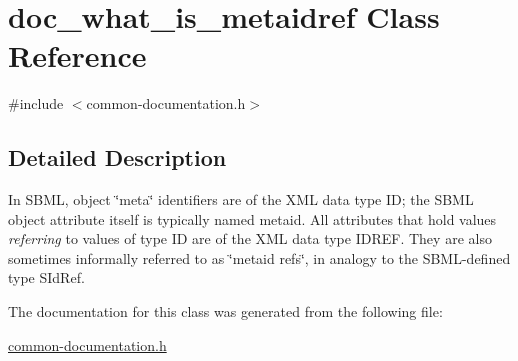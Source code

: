 \hypertarget{classdoc__what__is__metaidref}{}\section{doc\+\_\+what\+\_\+is\+\_\+metaidref Class Reference}
\label{classdoc__what__is__metaidref}


{\ttfamily \#include $<$common-\/documentation.\+h$>$}



\subsection{Detailed Description}
\begin{DoxyParagraph}{}
In S\+B\+ML, object \char`\"{}meta\char`\"{} identifiers are of the X\+ML data type {\ttfamily ID}; the S\+B\+ML object attribute itself is typically named {\ttfamily metaid}. All attributes that hold values {\itshape referring} to values of type {\ttfamily ID} are of the X\+ML data type {\ttfamily I\+D\+R\+EF}. They are also sometimes informally referred to as \char`\"{}metaid refs\char`\"{}, in analogy to the S\+B\+M\+L-\/defined type {\ttfamily S\+Id\+Ref}. 
\end{DoxyParagraph}


The documentation for this class was generated from the following file\+:\begin{DoxyCompactItemize}
\item 
\hyperlink{common-documentation_8h}{common-\/documentation.\+h}\end{DoxyCompactItemize}
